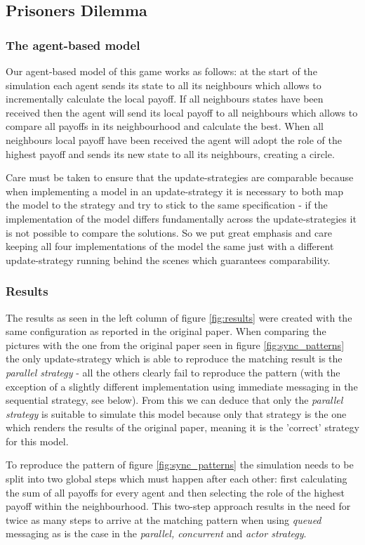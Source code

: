 \subsection{Prisoners Dilemma}
\subsubsection{The agent-based model}
Our agent-based model of this game works as follows: at the start of the simulation each agent sends its state to all its neighbours which allows to incrementally calculate the local payoff. If all neighbours states have been received then the agent will send its local payoff to all neighbours which allows to compare all payoffs in its neighbourhood and calculate the best. When all neighbours local payoff have been received the agent will adopt the role of the highest payoff and sends its new state to all its neighbours, creating a circle. 

Care must be taken to ensure that the update-strategies are comparable because when implementing a model in an update-strategy it is necessary to both map the model to the strategy and try to stick to the same specification - if the implementation of the model differs fundamentally across the update-strategies it is not possible to compare the solutions. So we put great emphasis and care keeping all four implementations of the model the same just with a different update-strategy running behind the scenes which guarantees comparability.

\subsubsection{Results}
The results as seen in the left column of figure \ref{fig:results} were created with the same configuration as reported in the original paper. When comparing the pictures with the one from the original paper seen in figure \ref{fig:sync_patterns} the only update-strategy which is able to reproduce the matching result is the \textit{parallel strategy} - all the others clearly fail to reproduce the pattern (with the exception of a slightly different implementation using immediate messaging in the sequential strategy, see below). From this we can deduce that only the \textit{parallel strategy} is suitable to simulate this model because only that strategy is the one which renders the results of the original paper, meaning it is the 'correct' strategy for this model. 

To reproduce the pattern of figure \ref{fig:sync_patterns} the simulation needs to be split into two global steps which must happen after each other: first calculating the sum of all payoffs for every agent and then selecting the role of the highest payoff within the neighbourhood. This two-step approach results in the need for twice as many steps to arrive at the matching pattern when using \textit{queued} messaging as is the case in the \textit{parallel, concurrent} and \textit{actor strategy}.

